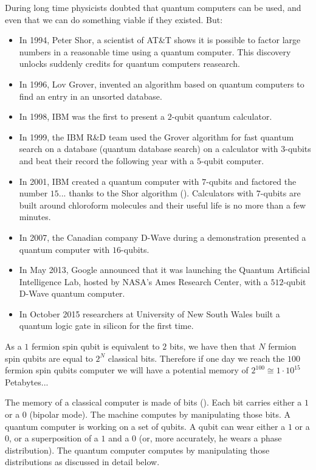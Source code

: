 	During long time physicists doubted that quantum computers can be used, and even that we can do something viable if they existed. But:
	\begin{itemize}
		\item In 1994, Peter Shor, a scientist of AT\&T shows it is possible to factor large numbers in a reasonable time using a quantum computer. This discovery unlocks suddenly credits for quantum computers reasearch.
		
		\item In 1996, Lov Grover, invented an algorithm based on quantum computers to find an entry in an unsorted database.
		
		\item In 1998, IBM was the first to present a $2$-qubit quantum calculator.
		
		\item In 1999, the IBM R\&D team used the Grover algorithm for fast quantum search on a database (quantum database search) on a calculator with $3$-qubits and beat their record the following year with a $5$-qubit computer.
		
		\item In 2001, IBM created a quantum computer with $7$-qubits and factored the number $15$... thanks to the Shor algorithm (). Calculators with $7$-qubits are built around chloroform molecules and their useful life is no more than a few minutes.
		
		\item In 2007, the Canadian company D-Wave during a demonstration presented a quantum computer with $16$-qubits.
		
		\item In May 2013, Google announced that it was launching the Quantum Artificial Intelligence Lab, hosted by NASA's Ames Research Center, with a $512$-qubit D-Wave quantum computer. 
		
		\item In October 2015 researchers at University of New South Wales built a quantum logic gate in silicon for the first time.
	\end{itemize}
	\begin{tcolorbox}[title=Remark,colframe=black,arc=10pt]
	As a $1$ fermion spin qubit is equivalent to $2$ bits, we have then that $N$ fermion spin qubits are equal to $2^N$ classical bits. Therefore if one day we reach the $100$ fermion spin qubits computer we will have a potential memory of $2^{100}\cong 1\cdot 10^{15}$ Petabytes...
	\end{tcolorbox}
	The memory of a classical computer is made of bits (). Each bit carries either a $1$ or a $0$ (bipolar mode). The machine computes by manipulating those bits. A quantum computer is working on a set of qubits. A qubit can wear either a $1$ or a $0$, or a superposition of a $1$ and a $0$ (or, more accurately, he wears a phase distribution). The quantum computer computes by manipulating those distributions as discussed in detail below.
	
